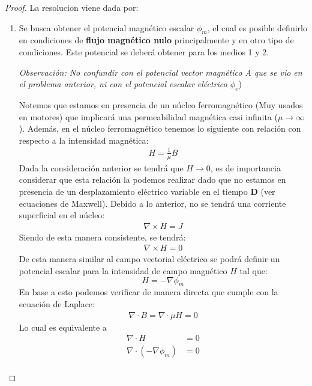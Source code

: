 \begin{proof}%
    La resolucion viene dada por:
   \begin{enumerate}
    \item Se busca obtener el potencial magnético escalar $\phi_{m}$, el cual es posible definirlo en condiciones de \textbf{flujo magnético nulo} principalmente y en otro tipo de condiciones. Este potencial se deberá obtener para los medios 1 y 2.
    
    \textit{Observación: No confundir con el potencial vector magnético A que se vio en el problema anterior, ni con el potencial escalar eléctrico $\phi_{e}$})

    Notemos que estamos en presencia de un núcleo ferromagnético (Muy usados en motores) que implicará una permeabilidad magnética casi infinita ($\mu \rightarrow \infty$). Además, en el núcleo ferromagnético tenemos lo siguiente con relación con respecto a la intensidad magnética: 
    \begin{align}
        H = \frac{1}{\mu} B 
    \end{align}
    Dada la consideración anterior se tendrá que $H \rightarrow 0 $, es de importancia considerar que esta relación la podemos realizar dado que no estamos en presencia de un desplazamiento eléctrico variable en el tiempo $\textbf{D}$ (ver ecuaciones de Maxwell). Debido a lo anterior, no se tendrá una corriente superficial en el núcleo: 
    \begin{align}
        \nabla \times H = J  
    \end{align}
    Siendo de esta manera consistente, se tendrá: 
    \begin{align}
        \nabla \times H = 0  
    \end{align}
    De esta manera similar al campo vectorial eléctrico se podrá definir un potencial escalar para la intensidad de campo magnético $H$ tal que:
    \begin{equation}
        H = -\nabla \phi_{m} 
    \end{equation}
    En base a esto podemos verificar de manera directa que cumple con la ecuación de Laplace:\\
    \begin{align}
        \nabla \cdot B = \nabla \cdot \mu H= 0 
    \end{align}
    Lo cual es equivalente a 
    \begin{align}
        \nabla \cdot H &= 0\\
        \nabla \cdot (-\nabla \phi_{m}) &= 0\\

\end{align}
\end{enumerate}
\end{proof}
